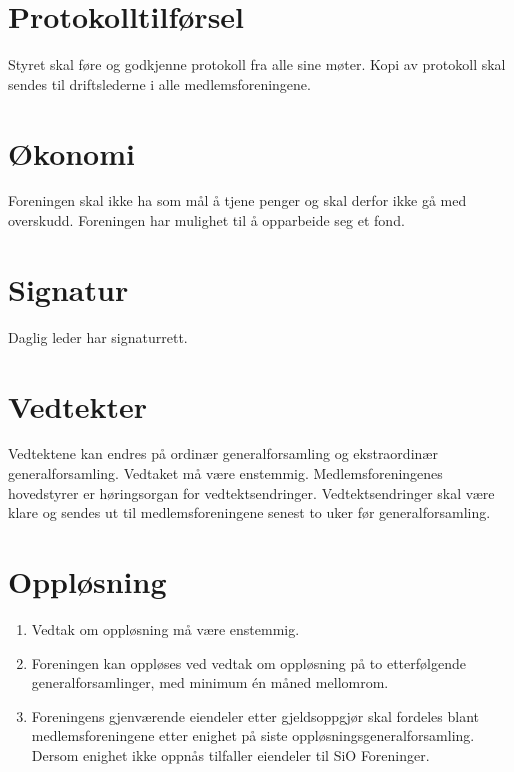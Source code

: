 \documentclass[11pt,norsk,a4paper]{article}
\begin{document}
\section{Protokolltilførsel}
Styret skal føre og godkjenne protokoll fra alle sine møter.
Kopi av protokoll skal sendes til driftslederne i alle medlemsforeningene.


\section{Økonomi}
Foreningen skal ikke ha som mål å tjene penger og skal derfor ikke gå med overskudd.
Foreningen har mulighet til å opparbeide seg et fond.


\section{Signatur}
Daglig leder har signaturrett.


\section{Vedtekter\label{sec:vedtekter}}
Vedtektene kan endres på ordinær generalforsamling og ekstraordinær generalforsamling.
Vedtaket må være enstemmig. Medlemsforeningenes hovedstyrer er høringsorgan
for vedtektsendringer. Vedtektsendringer skal være klare og sendes ut til
medlemsforeningene senest to uker før generalforsamling.


\section{Oppløsning\label{sec:opplosing}}
\begin{enumerate}
	\item Vedtak om oppløsning må være enstemmig.
	\item Foreningen kan oppløses ved vedtak om oppløsning på to etterfølgende generalforsamlinger, med minimum én måned mellomrom.
	\item Foreningens gjenværende eiendeler etter gjeldsoppgjør skal fordeles blant medlemsforeningene etter enighet på siste oppløsningsgeneralforsamling. Dersom enighet ikke oppnås tilfaller eiendeler til SiO Foreninger.
\end{enumerate}
\end{document}
